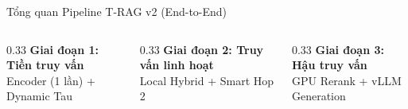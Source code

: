 \documentclass[aspectratio=169,10pt]{beamer}
\begin{document}
\begin{frame}{Tổng quan Pipeline T-RAG v2 (End-to-End)}
{\begin{tikzpicture}
\end{tikzpicture}
}

\vspace{0.3cm}
\begin{columns}
\begin{column}{0.33\textwidth}
\centering\footnotesize
\textcolor{tragblue}{\textbf{Giai đoạn 1: Tiền truy vấn}}\\Encoder (1 lần) + Dynamic Tau
\end{column}
\begin{column}{0.33\textwidth}
\centering\footnotesize
\textcolor{tragorange}{\textbf{Giai đoạn 2: Truy vấn linh hoạt}}\\Local Hybrid + Smart Hop 2
\end{column}
\begin{column}{0.33\textwidth}
\centering\footnotesize
\textcolor{traggreen}{\textbf{Giai đoạn 3: Hậu truy vấn}}\\GPU Rerank + vLLM Generation
\end{column}
\end{columns}
\end{frame}
\end{document}
